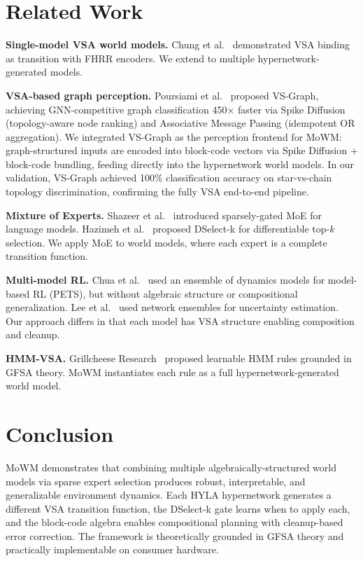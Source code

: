 \documentclass[journal]{IEEEtai}
\begin{document}
\section{Related Work}

\textbf{Single-model VSA world models.} Chung et al.~\cite{chung2025geometric} demonstrated VSA binding as transition with FHRR encoders. We extend to multiple hypernetwork-generated models.

\textbf{VSA-based graph perception.} Poursiami et al.~\cite{poursiami2025vsgraph} proposed VS-Graph, achieving GNN-competitive graph classification 450$\times$ faster via Spike Diffusion (topology-aware node ranking) and Associative Message Passing (idempotent OR aggregation). We integrated VS-Graph as the perception frontend for MoWM: graph-structured inputs are encoded into block-code vectors via Spike Diffusion + block-code bundling, feeding directly into the hypernetwork world models. In our validation, VS-Graph achieved 100\% classification accuracy on star-vs-chain topology discrimination, confirming the fully VSA end-to-end pipeline.

\textbf{Mixture of Experts.} Shazeer et al.~\cite{shazeer2017moe} introduced sparsely-gated MoE for language models. Hazimeh et al.~\cite{hazimeh2021dselect} proposed DSelect-k for differentiable top-$k$ selection. We apply MoE to world models, where each expert is a complete transition function.

\textbf{Multi-model RL.} Chua et al.~\cite{chua2018pets} used an ensemble of dynamics models for model-based RL (PETS), but without algebraic structure or compositional generalization. Lee et al.~\cite{lee2020sunrise} used network ensembles for uncertainty estimation. Our approach differs in that each model has VSA structure enabling composition and cleanup.

\textbf{HMM-VSA.} Grillcheese Research~\cite{grillcheese2025hmm} proposed learnable HMM rules grounded in GFSA theory. MoWM instantiates each rule as a full hypernetwork-generated world model.

\section{Conclusion}

MoWM demonstrates that combining multiple algebraically-structured world models via sparse expert selection produces robust, interpretable, and generalizable environment dynamics. Each HYLA hypernetwork generates a different VSA transition function, the DSelect-k gate learns when to apply each, and the block-code algebra enables compositional planning with cleanup-based error correction. The framework is theoretically grounded in GFSA theory and practically implementable on consumer hardware.
\end{document}
